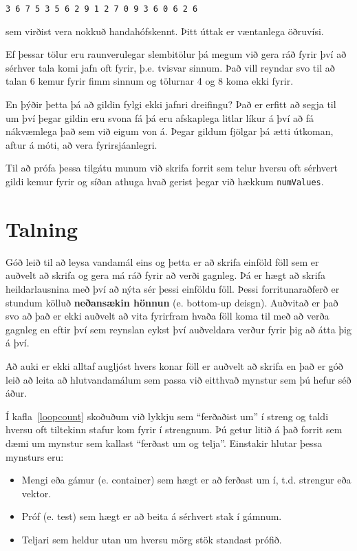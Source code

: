 \begin{verbatim}
3 6 7 5 3 5 6 2 9 1 2 7 0 9 3 6 0 6 2 6 
\end{verbatim}
%
sem virðist vera nokkuð handahófskennt.  Þitt úttak er væntanlega öðruvísi.

Ef þessar tölur eru raunverulegar slembitölur þá megum við gera ráð fyrir því að sérhver tala komi jafn oft fyrir, þ.e. tvisvar sinnum.
Það vill reyndar svo til að talan 6 kemur fyrir fimm sinnum og tölurnar 4 og 8 koma ekki fyrir.

En þýðir þetta þá að gildin fylgi ekki jafnri dreifingu?
Það er erfitt að segja til um því þegar gildin eru svona fá þá eru afskaplega litlar líkur á því að fá nákvæmlega það sem við eigum von á.
Þegar gildum fjölgar þá ætti útkoman, aftur á móti, að vera fyrirsjáanlegri.

Til að prófa þessa tilgátu munum við skrifa forrit sem telur hversu oft sérhvert gildi kemur fyrir og síðan athuga hvað gerist
þegar við hækkum {\tt numValues}.

\section{Talning}
\label{counting}

Góð leið til að leysa vandamál eins og þetta er að skrifa einföld föll sem er auðvelt að skrifa og gera má ráð fyrir að verði gagnleg.
Þá er hægt að skrifa heildarlausnina með því að nýta sér þessi einföldu föll.
Þessi forritunaraðferð er stundum kölluð {\bf neðansækin hönnun} (e. bottom-up deisgn).
Auðvitað er það svo að það er ekki auðvelt að vita fyrirfram hvaða föll koma til með að verða gagnleg
en eftir því sem reynslan eykst því auðveldara verður fyrir þig að átta þig á því.


Að auki er ekki alltaf augljóst hvers konar föll er auðvelt að skrifa en 
það er góð leið að leita að hlutvandamálum sem passa við eitthvað mynstur sem þú hefur séð áður.


Í kafla~\ref{loopcount} skoðuðum við lykkju sem ``ferðaðist um'' í streng og taldi hversu oft tiltekinn stafur kom fyrir í strengnum.
Þú getur litið á það forrit sem dæmi um mynstur sem kallast ``ferðast um og telja''.
Einstakir hlutar þessa mynsturs eru:

\begin{itemize}

\item Mengi eða gámur (e. container) sem hægt er að ferðast um í, t.d. strengur eða vektor. 

\item Próf (e. test) sem hægt er að beita á sérhvert stak í gámnum.

\item Teljari sem heldur utan um hversu mörg stök standast prófið. 

\end{itemize}

